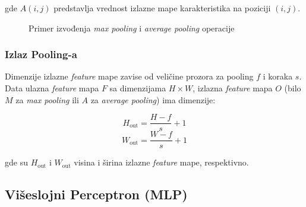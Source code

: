 \documentclass[12pt]{article}
\begin{document}
   gde \( A(i, j) \) predstavlja vrednost izlazne mape karakteristika na poziciji \((i, j)\).

   
   \begin{figure}[h!]
      \centering
      \caption{Primer izvođenja \textit{max pooling} i \textit{average pooling} operacije}
      \label{fig:max_avg_pooling}
    \end{figure}

   \subsubsection*{Izlaz Pooling-a}

   Dimenzije izlazne \textit{feature} mape zavise od veličine prozora za pooling \( f \) i koraka \( s \). 
   Data ulazna \textit{feature} mapa \( F \) sa dimenzijama \( H \times W \), izlazna \textit{feature} mapa \( O \) 
   (bilo \( M \) za \textit{max pooling} ili \( A \) za \textit{average pooling}) ima dimenzije:
   
   \[
   H_{\text{out}} = \frac{H - f}{s} + 1
   \]
   \[
   W_{\text{out}} = \frac{W - f}{s} + 1
   \]
   
   gde su \( H_{\text{out}} \) i \( W_{\text{out}} \) visina i širina izlazne \textit{feature} mape, respektivno.
   

   \subsection*{Višeslojni Perceptron (MLP)}
\end{document}
